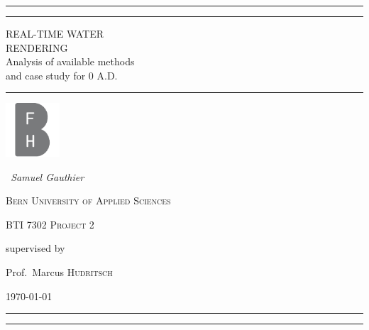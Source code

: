 \begin{titlepage}
	\centering

    \rule{0.8\textwidth}{1pt} 

	\vspace{2pt}\vspace{-\baselineskip}

	\rule{0.8\textwidth}{0.4pt}

	\vspace{0.1\textheight}

    \textcolor[rgb]{0.78,0,0}{
    {\Huge REAL-TIME WATER}\\[0.5\baselineskip]
    {\Huge RENDERING}\\[1.7\baselineskip]
    {\Large Analysis of available methods}\\
    {\Large and case study for 0 A.D.}
    }

    \vspace{0.025\textheight}
    \rule{0.3\textwidth}{0.4pt}

    \vspace{2cm}
    \includegraphics[width=0.15\textwidth]{figures/BFH_Logo_BW.pdf}\par\vspace{1cm}
    \vspace{1cm}
    {\Large\itshape~Samuel Gauthier\par}{}
    \vspace{0.5cm}
    {\scshape Bern University of Applied Sciences\par}
	{\scshape\Large BTI 7302 Project 2\par}

	\vspace{1cm}
	supervised by\par
	Prof.~Marcus \textsc{Hudritsch}
    \vspace{1cm}
	\vfill

	{\large \today\par}
    \vfill

    \rule{0.8\textwidth}{0.4pt}

	\vspace{2pt}\vspace{-\baselineskip}

	\rule{0.8\textwidth}{1pt}

\end{titlepage}
\restoregeometry{}
